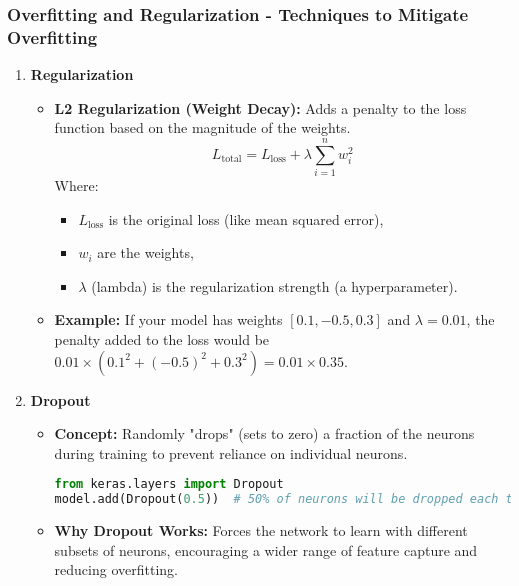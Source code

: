 \documentclass[aspectratio=169]{beamer}
\begin{document}
\begin{frame}[fragile]
    \frametitle{Overfitting and Regularization - Techniques to Mitigate Overfitting}
    \begin{enumerate}
        \item \textbf{Regularization}
        \begin{itemize}
            \item \textbf{L2 Regularization (Weight Decay):} Adds a penalty to the loss function based on the magnitude of the weights. 
            \begin{equation}
            L_{\text{total}} = L_{\text{loss}} + \lambda \sum_{i=1}^{n} w_i^2
            \end{equation}
            Where:
            \begin{itemize}
                \item \(L_{\text{loss}}\) is the original loss (like mean squared error),
                \item \(w_i\) are the weights,
                \item \(\lambda\) (lambda) is the regularization strength (a hyperparameter).
            \end{itemize}
            \item \textbf{Example:} If your model has weights \([0.1, -0.5, 0.3]\) and \(\lambda = 0.01\), the penalty added to the loss would be \(0.01 \times (0.1^2 + (-0.5)^2 + 0.3^2) = 0.01 \times 0.35\).
        \end{itemize}
        
        \item \textbf{Dropout}
        \begin{itemize}
            \item \textbf{Concept:} Randomly "drops" (sets to zero) a fraction of the neurons during training to prevent reliance on individual neurons.
            \begin{lstlisting}[language=Python]
from keras.layers import Dropout
model.add(Dropout(0.5))  # 50% of neurons will be dropped each training iteration
            \end{lstlisting}
            \item \textbf{Why Dropout Works:} Forces the network to learn with different subsets of neurons, encouraging a wider range of feature capture and reducing overfitting.
        \end{itemize}
    \end{enumerate}
\end{frame}
\end{document}
